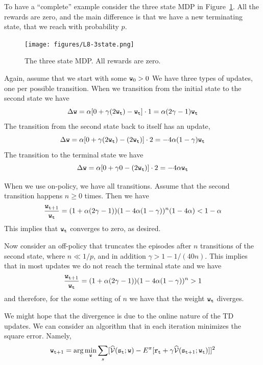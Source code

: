 To have a ``complete'' example consider the three state MDP in
Figure~\ref{fig:L8-3state}. All the rewards are zero, and the main
difference is that we have a new terminating state, that we reach
with probability $p$.

\begin{figure}
  \begin{centering}
  \texttt{[image: figures/L8-3state.png]}\\
  \caption{The three state MDP. All rewards are zero.}\label{fig:L8-3state}
  \end{centering}
\end{figure}




Again, assume that we start with some ${\tt w}_0>0$ We have three
types of updates, one per possible transition. When we transition
from the initial state to the second state we have
\[
\Delta {\tt w}= \alpha[0+\gamma
(2{\tt w}_{\tt t})-{\tt w}_{\tt t}]\cdot
1=\alpha(2\gamma-1){\tt w}_{\tt t}
\]
The transition from the second state back to itself has an update,
\[
\Delta {\tt w}= \alpha[0+\gamma
(2{\tt w}_{\tt t})-(2{\tt w}_{\tt t})]\cdot 2
=-4\alpha(1-\gamma){\tt w}_{\tt t}
\]
The transition to the terminal state we have
\[
\Delta {\tt w}= \alpha[0+\gamma 0 -(2{\tt w}_{\tt t})]\cdot
2=-4\alpha {\tt w}_{\tt t}
\]



When we use on-policy, we have all transitions. Assume that the
second transition happens $n\geq 0$ times. Then we have
\[
\frac{{\tt w}_{{\tt t}+1}}{{\tt w}_{\tt t}}=(1+\alpha(2\gamma-1))(1-4\alpha(1-\gamma))^n(1-4\alpha)<
1-\alpha
\]
This implies that ${\tt w}_{\tt t}$ converges to zero, as desired.

Now consider an off-policy that truncates the episodes after $n$
transitions of the second state, where $n\ll 1/p$, and in addition
$\gamma> 1-1/(40n)$. This implies that in most updates we do not
reach the terminal state and we have
\[
\frac{{\tt w}_{{\tt t}+1}}{{\tt w}_{\tt t}}=(1+\alpha(2\gamma-1))(1-4\alpha(1-\gamma))^n>1
\]
and therefore, for the some setting of $n$ we have that the weight
${\tt w}_{\tt t}$ diverges.

We might hope that the divergence is due to the online nature of the
TD updates. We can consider an algorithm that in each iteration
minimizes the square error. Namely,
\[
{\tt w}_{{\tt t}+1}=\arg\min_{\tt w}\sum_s
[\widehat{\mathcal{V}}({\tt s}_{\tt t};{\tt w})-E^\pi[{\tt r}_{\tt t}+\gamma\widehat{\mathcal{V}}({\tt s}_{{\tt t}+1};{\tt w}_{\tt t})]]^2
\]

